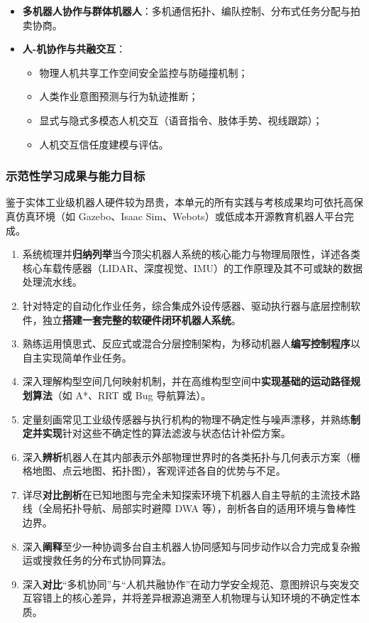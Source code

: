 \begin{itemize}
\begin{itemize}
        \item 关节伺服动力学建模与顺应性阻抗控制；
        \item 基于机器视觉的伺服闭环控制。
    \end{itemize}
    \item \textbf{多机器人协作与群体机器人}：多机通信拓扑、编队控制、分布式任务分配与拍卖协商。
    \item \textbf{人-机协作与共融交互}：
    \begin{itemize}
        \item 物理人机共享工作空间安全监控与防碰撞机制；
        \item 人类作业意图预测与行为轨迹推断；
        \item 显式与隐式多模态人机交互（语音指令、肢体手势、视线跟踪）；
        \item 人机交互信任度建模与评估。
    \end{itemize}
\end{itemize}

\subsubsection{示范性学习成果与能力目标}
\begin{infobox}[教学实现模式说明]
鉴于实体工业级机器人硬件较为昂贵，本单元的所有实践与考核成果均可依托高保真仿真环境（如 Gazebo、Isaac Sim、Webots）或低成本开源教育机器人平台完成。
\end{infobox}
\begin{enumerate}
    \item 系统梳理并\textbf{归纳列举}当今顶尖机器人系统的核心能力与物理局限性，详述各类核心车载传感器（LIDAR、深度视觉、IMU）的工作原理及其不可或缺的数据处理流水线。
    \item 针对特定的自动化作业任务，综合集成外设传感器、驱动执行器与底层控制软件，独立\textbf{搭建一套完整的软硬件闭环机器人系统}。
    \item 熟练运用慎思式、反应式或混合分层控制架构，为移动机器人\textbf{编写控制程序}以自主实现简单作业任务。
    \item 深入理解构型空间几何映射机制，并在高维构型空间中\textbf{实现基础的运动路径规划算法}（如 A*、RRT 或 Bug 导航算法）。
    \item 定量刻画常见工业级传感器与执行机构的物理不确定性与噪声漂移，并熟练\textbf{制定并实现}针对这些不确定性的算法滤波与状态估计补偿方案。
    \item 深入\textbf{辨析}机器人在其内部表示外部物理世界时的各类拓扑与几何表示方案（栅格地图、点云地图、拓扑图），客观评述各自的优势与不足。
    \item 详尽\textbf{对比剖析}在已知地图与完全未知探索环境下机器人自主导航的主流技术路线（全局拓扑导航、局部实时避障 DWA 等），剖析各自的适用环境与鲁棒性边界。
    \item 深入\textbf{阐释}至少一种协调多台自主机器人协同感知与同步动作以合力完成复杂搬运或搜救任务的分布式协同算法。
    \item 深入\textbf{对比}“多机协同”与“人机共融协作”在动力学安全规范、意图辨识与突发交互容错上的核心差异，并将差异根源追溯至人机物理与认知环境的不确定性本质。
\end{enumerate}

